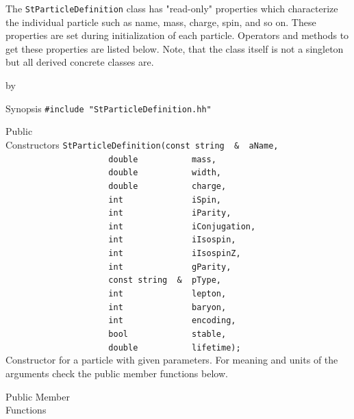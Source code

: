 \documentclass[twoside]{article}
\newcommand{\comp}[1]{\texttt{#1}}%
\newcommand{\entrylabel}[1]{\mbox{\textbf{{#1}}}\hfil}%
\newenvironment{entry}
{\begin{list}{}%
    {\renewcommand{\makelabel}{\entrylabel}%
     \setlength{\labelwidth}{90pt}%
     \setlength{\leftmargin}{\labelwidth}
     \advance\leftmargin by \labelsep%
      }%
    }%
  {\end{list}}
\newcommand{\Entrylabel}[1]%
{\raisebox{0pt}[1ex][0pt]{\makebox[\labelwidth][l]%
    {\parbox[t]{\labelwidth}{\hspace{0pt}\textbf{{#1}}}}}}
\newenvironment{Entry}%
{\renewcommand{\entrylabel}{\Entrylabel}\begin{entry}}%
  {\end{entry}}
\begin{document}
\begin{description}
The \comp{StParticleDefinition} class has "read-only" properties which
characterize the individual particle such as name, mass, charge, spin, and
so on. These properties are set during initialization of each particle.
Operators and methods to get these properties are listed below. Note,
that the class itself is not a singleton but all derived concrete
classes are.

\begin{Entry}
\item[Synopsis]
    \verb+#include "StParticleDefinition.hh"+\\    
    
\item[Public\\ Constructors]
    \verb+StParticleDefinition(const string  &  aName,+\\  
    \verb+                     double           mass,+\\      
    \verb+                     double           width,+\\ 
    \verb+                     double           charge,+\\    
    \verb+                     int              iSpin,+\\ 
    \verb+                     int              iParity,+\\ 
    \verb+                     int              iConjugation,+\\ 
    \verb+                     int              iIsospin,+\\    
    \verb+                     int              iIsospinZ,+\\  
    \verb+                     int              gParity,+\\ 
    \verb+                     const string  &  pType,+\\ 
    \verb+                     int              lepton,+\\ 
    \verb+                     int              baryon,+\\ 
    \verb+                     int              encoding,+\\ 
    \verb+                     bool             stable,+\\ 
    \verb+                     double           lifetime);+\\ 
    Constructor for a particle with given parameters. For meaning and units
    of the arguments check the public member functions below.
    
\item[Public Member\\ Functions]
   

\end{Entry}
\end{description}
\end{document}

